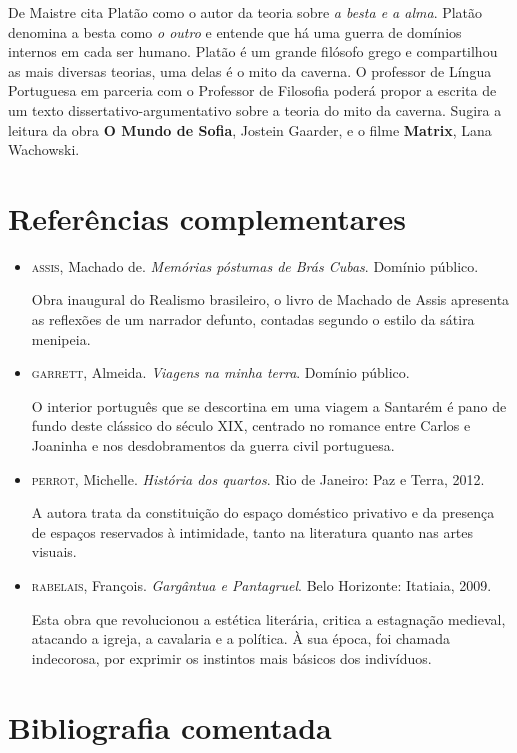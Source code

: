 \documentclass[12pt]{extarticle}
\begin{document}
De Maistre cita Platão como o autor da teoria sobre \emph{a besta e a
alma}. Platão denomina a besta como \emph{o outro} e entende que há
uma guerra de domínios internos em cada ser humano. Platão é um grande
filósofo grego 
e compartilhou as mais diversas teorias, uma delas é o mito da caverna.
O professor de Língua Portuguesa em parceria com o Professor de
Filosofia poderá propor a escrita de um texto dissertativo-argumentativo
sobre a teoria do mito da caverna. Sugira a leitura da obra \textbf{O
Mundo de Sofia}, Jostein Gaarder, e o filme \textbf{Matrix}, Lana
Wachowski.

\section{Referências complementares}

\begin{itemize}
\item\textsc{assis}, Machado de. \textit{Memórias póstumas de Brás Cubas}. Domínio
público.

Obra inaugural do Realismo brasileiro, o livro de Machado de Assis
apresenta as reflexões de um narrador defunto, contadas segundo o estilo
da sátira menipeia.

\item\textsc{garrett}, Almeida. \textit{Viagens na minha terra}. Domínio público.

O interior português que se descortina em uma viagem a Santarém é pano
de fundo deste clássico do século XIX, centrado no romance entre Carlos
e Joaninha e nos desdobramentos da guerra civil portuguesa.

\item\textsc{perrot}, Michelle. \textit{História dos quartos}. Rio de Janeiro: Paz e
Terra, 2012.

A autora trata da constituição do espaço doméstico privativo e da
presença de espaços reservados à intimidade, tanto na literatura quanto
nas artes visuais.

\item\textsc{rabelais}, François. \textit{Gargântua e Pantagruel}. Belo Horizonte:
Itatiaia, 2009.

Esta obra que revolucionou a estética literária, critica a estagnação
medieval, atacando a igreja, a cavalaria e a política. À sua época, foi
chamada indecorosa, por exprimir os instintos mais básicos dos
indivíduos.
\end{itemize}

\section{Bibliografia comentada}
\end{document}
